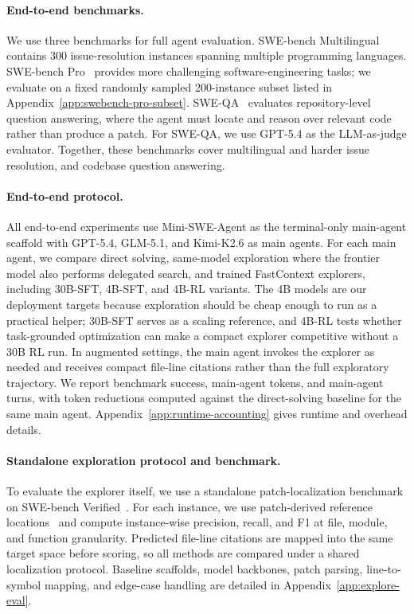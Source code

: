 \documentclass[11pt]{article}
\newcommand{\approach}{{FastContext}\xspace}
\begin{document}
\paragraph{End-to-end benchmarks.}
We use three benchmarks for full agent evaluation.
SWE-bench Multilingual contains 300 issue-resolution instances spanning multiple programming languages.
SWE-bench Pro~\cite{swebenchpro} provides more challenging software-engineering tasks; we evaluate on a fixed randomly sampled 200-instance subset listed in Appendix~\ref{app:swebench-pro-subset}.
SWE-QA~\cite{sweqa} evaluates repository-level question answering, where the agent must locate and reason over relevant code rather than produce a patch.
For SWE-QA, we use GPT-5.4 as the LLM-as-judge evaluator.
Together, these benchmarks cover multilingual and harder issue resolution, and codebase question answering.

\paragraph{End-to-end protocol.}
All end-to-end experiments use Mini-SWE-Agent as the terminal-only main-agent scaffold with GPT-5.4, GLM-5.1, and Kimi-K2.6 as main agents.
For each main agent, we compare direct solving, same-model exploration where the frontier model also performs delegated search, and trained \approach explorers, including 30B-SFT, 4B-SFT, and 4B-RL variants.
The 4B models are our deployment targets because exploration should be cheap enough to run as a practical helper; 30B-SFT serves as a scaling reference, and 4B-RL tests whether task-grounded optimization can make a compact explorer competitive without a 30B RL run.
In augmented settings, the main agent invokes the explorer as needed and receives compact file-line citations rather than the full exploratory trajectory.
We report benchmark success, main-agent tokens, and main-agent turns, with token reductions computed against the direct-solving baseline for the same main agent.
Appendix~\ref{app:runtime-accounting} gives runtime and overhead details.

\vspace{-3mm}
\paragraph{Standalone exploration protocol and benchmark.}
To evaluate the explorer itself, we use a standalone patch-localization benchmark on SWE-bench Verified~\cite{swebench}.
For each instance, we use patch-derived reference locations~\cite{codescout} and compute instance-wise precision, recall, and F1 at file, module, and function granularity.
Predicted file-line citations are mapped into the same target space before scoring, so all methods are compared under a shared localization protocol.
Baseline scaffolds, model backbones, patch parsing, line-to-symbol mapping, and edge-case handling are detailed in Appendix~\ref{app:explore-eval}.
\end{document}
